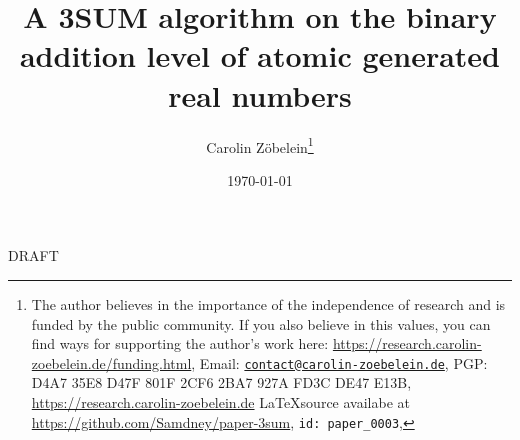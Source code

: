 \documentclass{article}
\newtheorem*{theorem A}{Theorem A}
\newtheorem*{theorem B}{N\"olker's Theorem}
\theoremstyle{remark}
\theoremstyle{remark}
\begin{document}
\title{A 3SUM algorithm on the binary addition level of atomic generated real numbers}
\author{Carolin Z\"obelein\thanks{The author believes in the importance of the independence of research and is funded by the public community. If you also believe in this values, you can find ways for supporting the author's work here: \url{https://research.carolin-zoebelein.de/funding.html}, Email: \href{mailto:contact@carolin-zoebelein.de}{\texttt{contact@carolin-zoebelein.de}}, PGP: D4A7 35E8 D47F 801F 2CF6 2BA7 927A FD3C DE47 E13B, \url{https://research.carolin-zoebelein.de} \LaTeX source availabe at \url{https://github.com/Samdney/paper-3sum}, \texttt{id: paper\_0003}, \Cooley}}
\date{\today}
\maketitle
\begin{center}
    DRAFT
\end{center}

\providecommand{\keywords}[1]{\small{\textbf{\textit{Keywords:}} #1}}
\providecommand{\Classification}[1]{\small{\textbf{\textit{ACM Subject Classes:}} #1}}
\end{document}

